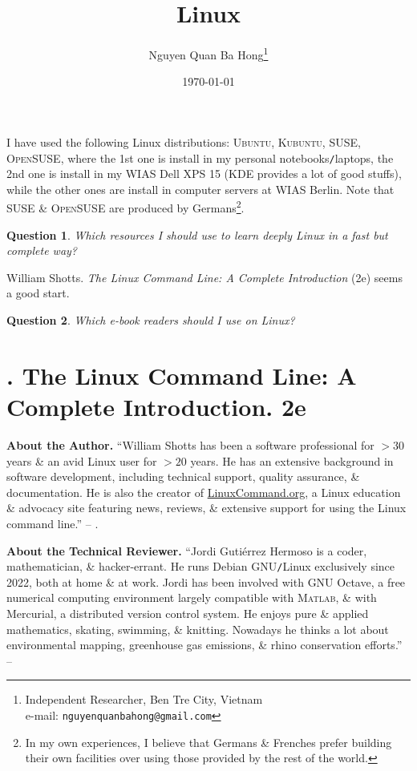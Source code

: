 \documentclass[oneside]{book}
\title{Linux}
\author{Nguyen Quan Ba Hong\footnote{Independent Researcher, Ben Tre City, Vietnam\\e-mail: \texttt{nguyenquanbahong@gmail.com}}}
\date{\today}
\numberwithin{equation}{section}
\newtheorem{question}{Question}[chapter]
\begin{document}
\maketitle
\tableofcontents

I have used the following Linux distributions: \textsc{Ubuntu, Kubuntu, SUSE, OpenSUSE}, where the 1st one is install in my personal notebooks\texttt{/}laptops, the 2nd one is install in my WIAS Dell XPS 15 (KDE provides a lot of good stuffs), while the other ones are install in computer servers at WIAS Berlin. Note that SUSE \& \textsc{OpenSUSE} are produced by Germans\footnote{In my own experiences, I believe that Germans \& Frenches prefer building their own facilities over using those provided by the rest of the world.}.

\begin{question}
	Which resources I should use to learn deeply Linux in a fast but complete way?
\end{question}
William Shotts. \textit{The Linux Command Line: A Complete Introduction} (2e) seems a good start.

\begin{question}
	Which e-book readers should I use on Linux?
\end{question}


\chapter{\cite{Shotts2019}. The Linux Command Line: A Complete Introduction. 2e}

\textbf{About the Author.} ``William Shotts has been a software professional for $> 30$ years \& an avid Linux user for $> 20$ years. He has an extensive background in software development, including technical support, quality assurance, \& documentation. He is also the creator of \url{LinuxCommand.org}, a Linux education \& advocacy site featuring news, reviews, \& extensive support for using the Linux command line.'' -- \cite[p. 6]{Shotts2019}.

\noindent\textbf{About the Technical Reviewer.} ``Jordi Guti\'errez Hermoso is a coder, mathematician, \& hacker-errant. He runs Debian GNU\texttt{/}Linux exclusively since 2022, both at home \& at work. Jordi has been involved with GNU Octave, a free numerical computing environment largely compatible with \textsc{Matlab}, \& with Mercurial, a distributed version control system. He enjoys pure \& applied mathematics, skating, swimming, \& knitting. Nowadays he thinks a lot about environmental mapping, greenhouse gas emissions, \& rhino conservation efforts.'' -- \cite[p. 7]{Shotts2019}
\end{document}
